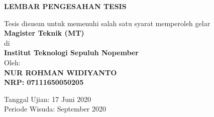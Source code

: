 \AddToShipoutPicture*{\BackgroundImage}

\begin{center}
	\Large\textbf{LEMBAR PENGESAHAN TESIS}
\end{center}

\begin{center}
	Tesis disusun untuk memenuhi salah satu syarat memperoleh gelar\\
	\textbf{Magister Teknik (MT)}\\
	di\\
	\textbf{Institut Teknologi Sepuluh Nopember}\\
	Oleh:\\
	\textbf{NUR ROHMAN WIDIYANTO}\\
	\textbf{NRP: 07111650050205}
\end{center}

\begin{center}
	Tanggal Ujian: 17 Juni 2020\\
	Periode Wisuda: September 2020
\end{center}


